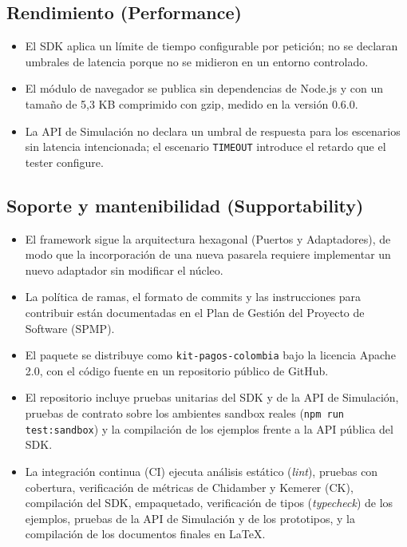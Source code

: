 \subsection{Rendimiento (Performance)}

\begin{itemize}
  \item El SDK aplica un límite de tiempo configurable por petición; no se declaran umbrales de latencia porque no se midieron en un entorno controlado.
  \item El módulo de navegador se publica sin dependencias de Node.js y con un tamaño de 5,3 KB comprimido con gzip, medido en la versión 0.6.0.
  \item La API de Simulación no declara un umbral de respuesta para los escenarios sin latencia intencionada; el escenario \texttt{TIMEOUT} introduce el retardo que el tester configure.
\end{itemize}

\subsection{Soporte y mantenibilidad (Supportability)}

\begin{itemize}
  \item El framework sigue la arquitectura hexagonal (Puertos y Adaptadores), de modo que la incorporación de una nueva pasarela requiere implementar un nuevo adaptador sin modificar el núcleo.
  \item La política de ramas, el formato de commits y las instrucciones para contribuir están documentadas en el Plan de Gestión del Proyecto de Software (SPMP).
  \item El paquete se distribuye como \texttt{kit-pagos-colombia} bajo la licencia Apache 2.0, con el código fuente en un repositorio público de GitHub.
  \item El repositorio incluye pruebas unitarias del SDK y de la API de Simulación, pruebas de contrato sobre los ambientes sandbox reales (\texttt{npm run test:sandbox}) y la compilación de los ejemplos frente a la API pública del SDK.
  \item La integración continua (CI) ejecuta análisis estático (\textit{lint}), pruebas con cobertura, verificación de métricas de Chidamber y Kemerer (CK), compilación del SDK, empaquetado, verificación de tipos (\textit{typecheck}) de los ejemplos, pruebas de la API de Simulación y de los prototipos, y la compilación de los documentos finales en LaTeX.
\end{itemize}

